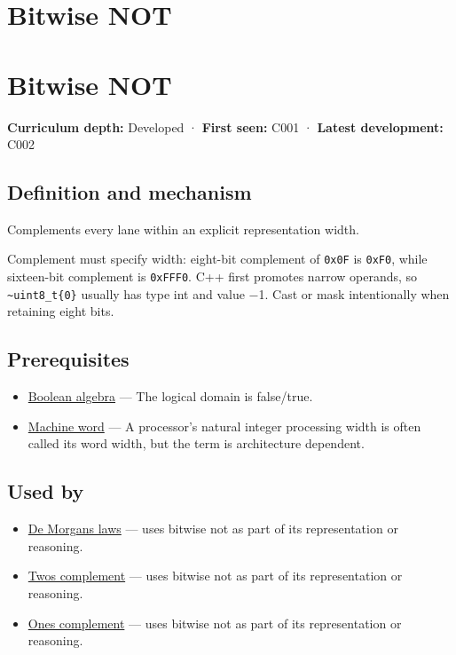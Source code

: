 \hypertarget{appendix-8f38927cfc54}{}
\section*{Bitwise NOT}
\section{Bitwise NOT}\label{appendix-8f38927cfc54-bitwise-not}

\textbf{Curriculum depth:} Developed · \textbf{First seen:} C001 · \textbf{Latest development:} C002

\subsection{Definition and mechanism}\label{appendix-8f38927cfc54-definition-and-mechanism}

Complements every lane within an explicit representation width.

Complement must specify width: eight-bit complement of \texttt{0x0F} is \texttt{0xF0}, while sixteen-bit complement is \texttt{0xFFF0}. C++ first promotes narrow operands, so \texttt{\textasciitilde{}uint8\_t\{0\}} usually has type int and value −1. Cast or mask intentionally when retaining eight bits.

\subsection{Prerequisites}\label{appendix-8f38927cfc54-prerequisites}

\begin{itemize}
\tightlist
\item
  \hyperref[appendix-24475e1596a8]{Boolean algebra} --- The logical domain is false/true.
\item
  \hyperref[appendix-d67a19507dc5]{Machine word} --- A processor's natural integer processing width is often called its word width, but the term is architecture dependent.
\end{itemize}

\subsection{Used by}\label{appendix-8f38927cfc54-used-by}

\begin{itemize}
\tightlist
\item
  \hyperref[appendix-9079d3659da4]{De Morgan\textquotesingle s laws} --- uses bitwise not as part of its representation or reasoning.
\item
  \hyperref[appendix-4fbc03d20829]{Two\textquotesingle s complement} --- uses bitwise not as part of its representation or reasoning.
\item
  \hyperref[appendix-03c678cd40b3]{One\textquotesingle s complement} --- uses bitwise not as part of its representation or reasoning.
\end{itemize}

